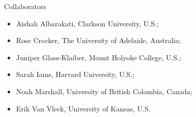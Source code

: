 \documentclass[aspectratio=169]{beamer}
\begin{document}
\begin{frame}{Collaborators}
\vfill
    \begin{itemize}
        \item Aishah Albarakati, Clarkson University, U.S.;
        \item Rose Crocker, The University of Adelaide, Australia;
        \item Juniper Glass-Klaiber, Mount Holyoke College, U.S.;
        \item Sarah Iams, Harvard University, U.S.;
        \item Noah Marshall, University of British Colombia, Canada;
        \item Erik Van Vleck, University of Kansas, U.S.
    \end{itemize}
\vfill
\end{frame}
\end{document}
